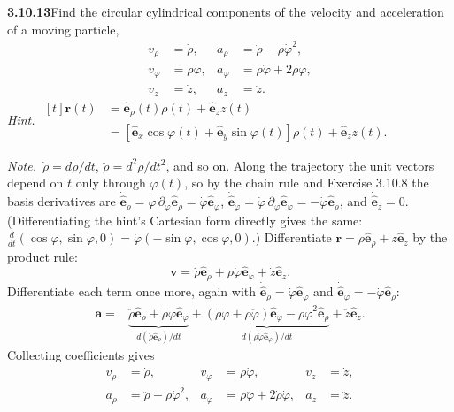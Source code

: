 \par\bigskip
\noindent\textbf{3.10.13}\quad Find the circular cylindrical components of the
velocity and acceleration of a moving particle,
\[
\begin{aligned}
v_{\rho}&=\dot{\rho},&a_{\rho}&=\ddot{\rho}-\rho\dot{\varphi}^{2},\\
v_{\varphi}&=\rho\dot{\varphi},&a_{\varphi}&=\rho\ddot{\varphi}
+2\dot{\rho}\dot{\varphi},\\
v_{z}&=\dot{z},&a_{z}&=\ddot{z}.
\end{aligned}
\]
\emph{Hint.}\quad
$\begin{aligned}[t]
\mathbf{r}(t)&=\hat{\mathbf{e}}_{\rho}(t)\rho(t)+\hat{\mathbf{e}}_{z}z(t)\\
&=[\hat{\mathbf{e}}_{x}\cos\varphi(t)+\hat{\mathbf{e}}_{y}\sin\varphi(t)]
\rho(t)+\hat{\mathbf{e}}_{z}z(t).
\end{aligned}$

\emph{Note.}~$\dot{\rho}=d\rho/dt$, $\ddot{\rho}=d^{2}\rho/dt^{2}$, and so on.
\solution
Along the trajectory the unit vectors depend on $t$ only through
$\varphi(t)$, so by the chain rule and Exercise 3.10.8 the basis
derivatives are
$\dot{\hat{\mathbf e}}_\rho=\dot\varphi\,\partial_\varphi\hat{\mathbf e}_\rho
=\dot\varphi\hat{\mathbf e}_\varphi$,
$\dot{\hat{\mathbf e}}_\varphi=\dot\varphi\,\partial_\varphi\hat{\mathbf e}_\varphi
=-\dot\varphi\hat{\mathbf e}_\rho$,
and $\dot{\hat{\mathbf e}}_z=0$.
(Differentiating the hint's Cartesian form directly gives the same:
$\frac d{dt}(\cos\varphi,\sin\varphi,0)=\dot\varphi(-\sin\varphi,\cos\varphi,0)$.)
Differentiate $\mathbf r=\rho\hat{\mathbf e}_\rho+z\hat{\mathbf e}_z$
by the product rule:
\[
\mathbf v=\dot\rho\hat{\mathbf e}_\rho+
\rho\dot\varphi\hat{\mathbf e}_\varphi+\dot z\hat{\mathbf e}_z.
\]
Differentiate each term once more, again with
$\dot{\hat{\mathbf e}}_\rho=\dot\varphi\hat{\mathbf e}_\varphi$ and
$\dot{\hat{\mathbf e}}_\varphi=-\dot\varphi\hat{\mathbf e}_\rho$:
\[
\begin{aligned}
\mathbf a={}&\underbrace{\ddot\rho\hat{\mathbf e}_\rho+
\dot\rho\dot\varphi\hat{\mathbf e}_\varphi}_{d(\dot\rho\hat{\mathbf e}_\rho)/dt}
+\underbrace{(\dot\rho\dot\varphi+\rho\ddot\varphi)\hat{\mathbf e}_\varphi
-\rho\dot\varphi^2\hat{\mathbf e}_\rho}_{d(\rho\dot\varphi\hat{\mathbf e}_\varphi)/dt}
+\ddot z\hat{\mathbf e}_z.
\end{aligned}
\]
Collecting coefficients gives
\[
\boxed{\begin{aligned}
v_\rho&=\dot\rho,&v_\varphi&=\rho\dot\varphi,&v_z&=\dot z,\\
a_\rho&=\ddot\rho-\rho\dot\varphi^2,&
a_\varphi&=\rho\ddot\varphi+2\dot\rho\dot\varphi,&a_z&=\ddot z.
\end{aligned}}
\]

